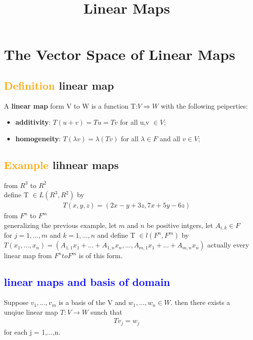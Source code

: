 \documentclass[a4paper,12pt]{article}
\begin{document}
\title {Linear Maps}
\maketitle

\tableofcontents
\newpage

\section{\textbf{The Vector Space of Linear Maps}}
    \subsection{\textcolor{orange}{Definition} \textbf{linear map}}
    A \textbf{linear map} form V to W is a function T:$V \Rightarrow W $ with the following peiperties:
    \begin{itemize}
        \item \textbf{additivity}: $T(u+v)  = Tu = Tv$ for all u,v $\in V$;
        \item \textbf{homogeneity}: $T(\lambda v) = \lambda(Tv)$ for all $\lambda \in F$ and all $v \in V$;
    \end{itemize}
    \subsection{\textcolor{orange}{Example} lihnear maps}
    from $R^3$ to $R^2$ \\
    define T $\in L(R^3,R^2)$ by
    \begin{align*}
        T(x, y, z) = (2x - y + 3z, 7x + 5y - 6z)
    \end{align*}
    from $F^n$ to $F^m$\\
    generalizing the previous example, let $m$ and $n$ be positive intgers, let
    $A_{i,k} \in F$ for $j = 1,...,m$ and $k = 1,...,n$ and define T $\in l(F^n,F^m)$ by
    $T(x_1,...,x_n) = (A_{1,1}x_1 + ... + A_{1,n}x_n,...,A_{m,1}x_1 + ... + A_{m,n}x_n)$ 
    actually every linear map from $F^n to F^m$ is of this form.
    \subsection{\textcolor{blue}{linear maps and basis of domain}}
    Suppose $v_1,...,v_m$ is a basis of the V and $w_1,...,w_n \in W$. then there exists a unqiue
    linear map $T : V \rightarrow W$ sunch that
    \begin{align*}
        Tv_j = w_j
    \end{align*}
    for each j = 1,...,n.
\end{document}
